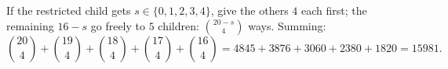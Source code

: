 If the restricted child gets $s\in\{0,1,2,3,4\}$, give the others $4$ each first; the remaining $16-s$ go freely to $5$ children: $\binom{20-s}4$ ways. Summing:
\[\binom{20}4+\binom{19}4+\binom{18}4+\binom{17}4+\binom{16}4=4845+3876+3060+2380+1820=\boxed{15981}.\]
